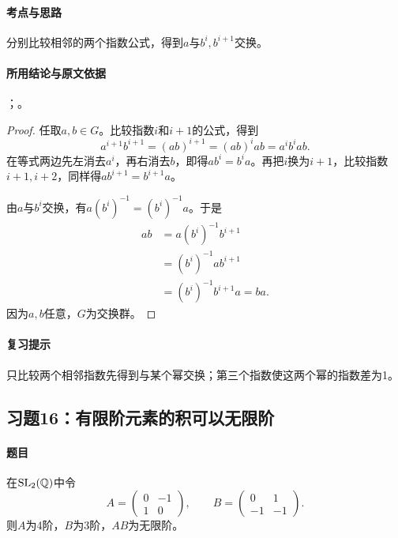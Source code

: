 \paragraph{考点与思路}
分别比较相邻的两个指数公式，得到$a$与$b^i,b^{i+1}$交换。

\paragraph{所用结论与原文依据}
；。


\begin{proof}
任取$a,b\in G$。比较指数$i$和$i+1$的公式，得到
\[
a^{i+1}b^{i+1}=(ab)^{i+1}=(ab)^i ab=a^ib^iab.
\]
在等式两边先左消去$a^i$，再右消去$b$，即得$ab^i=b^ia$。再把$i$换为$i+1$，比较指数$i+1,i+2$，同样得$ab^{i+1}=b^{i+1}a$。

由$a$与$b^i$交换，有$a(b^i)^{-1}=(b^i)^{-1}a$。于是
\begin{align*}
ab&=a(b^i)^{-1}b^{i+1}\\
&=(b^i)^{-1}ab^{i+1}\\
&=(b^i)^{-1}b^{i+1}a=ba.
\end{align*}
因为$a,b$任意，$G$为交换群。
\end{proof}

\paragraph{复习提示}
只比较两个相邻指数先得到与某个幂交换；第三个指数使这两个幂的指数差为1。


\subsection{习题16：\texorpdfstring{有限阶元素的积可以无限阶}{有限阶元素的积可以无限阶}}
\label{ex:1:16}

\paragraph{题目}
在$\operatorname{SL}_2(\mathbb Q)$中令
\[
A=\begin{pmatrix}0&-1\\1&0\end{pmatrix},\qquad B=\begin{pmatrix}0&1\\-1&-1\end{pmatrix}.
\]
则$A$为4阶，$B$为3阶，$AB$为无限阶。

